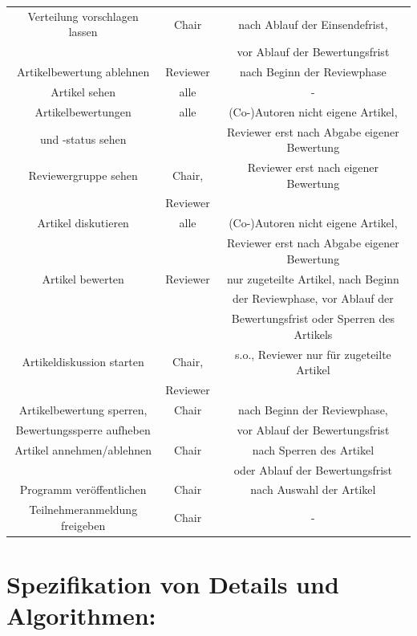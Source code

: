 \documentclass[headexclude,footexclude,12pt,BCOR0pt,DIV15]{scrartcl}
\begin{document}
\begin{tabular}{|c|c|c|}
          \hline
          Verteilung vorschlagen lassen & Chair & nach Ablauf der Einsendefrist, \\
           & & vor Ablauf der Bewertungsfrist \\
          \hline
          Artikelbewertung ablehnen & Reviewer & nach Beginn der Reviewphase \\
          \hline
          Artikel sehen & alle & - \\
          \hline
          Artikelbewertungen & alle & (Co-)Autoren nicht eigene Artikel, \\
          und -status sehen & & Reviewer erst nach Abgabe eigener Bewertung \\
          \hline
          Reviewergruppe sehen & Chair, & Reviewer erst nach eigener Bewertung \\
           & Reviewer & \\
          \hline
          Artikel diskutieren & alle & (Co-)Autoren nicht eigene Artikel, \\
           & & Reviewer erst nach Abgabe eigener Bewertung \\
          \hline
          Artikel bewerten & Reviewer & nur zugeteilte Artikel, nach Beginn \\
           & & der Reviewphase, vor Ablauf der \\
           & & Bewertungsfrist oder Sperren des Artikels \\
          \hline
          Artikeldiskussion starten & Chair, & s.o., Reviewer nur f\"{u}r zugeteilte Artikel \\
           & Reviewer & \\
          \hline
          Artikelbewertung sperren, & Chair & nach Beginn der Reviewphase, \\
           Bewertungssperre aufheben & & vor Ablauf der Bewertungsfrist \\
          \hline
          Artikel annehmen/ablehnen & Chair & nach Sperren des Artikel \\
           & & oder Ablauf der Bewertungsfrist \\
          \hline
          Programm ver\"{o}ffentlichen & Chair & nach Auswahl der Artikel \\
          \hline
          Teilnehmeranmeldung freigeben & Chair & - \\
          \hline
        \end{tabular}

    \pagebreak

\section{Spezifikation von Details und Algorithmen:}
\end{document}

